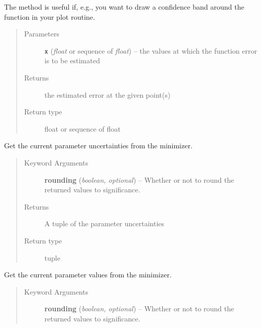 \documentclass[a4paper,10pt,english]{sphinxmanual}
\begin{document}
\begin{fulllineitems}
\begin{fulllineitems}
The method is useful if, e.g., you want to draw a confidence band
around the function in your plot routine.
\begin{quote}\begin{description}
\item[{Parameters}] \leavevmode
\textbf{\texttt{x}} (\emph{float} or sequence of \emph{float}) -- the values at which the function error is to be estimated

\item[{Returns}] \leavevmode
the estimated error at the given point(s)

\item[{Return type}] \leavevmode
float or sequence of float

\end{description}\end{quote}

\end{fulllineitems}


\begin{fulllineitems}
\label{index:kafe.fit.Fit.get_parameter_errors}
Get the current parameter uncertainties from the minimizer.
\begin{quote}\begin{description}
\item[{Keyword Arguments}] \leavevmode
\textbf{rounding} (\emph{boolean, optional}) --
Whether or not to round the returned values to significance.

\item[{Returns}] \leavevmode
A tuple of the parameter uncertainties

\item[{Return type}] \leavevmode
tuple

\end{description}\end{quote}

\end{fulllineitems}


\begin{fulllineitems}
\label{index:kafe.fit.Fit.get_parameter_values}
Get the current parameter values from the minimizer.
\begin{quote}\begin{description}
\item[{Keyword Arguments}] \leavevmode
\textbf{rounding} (\emph{boolean, optional}) --
Whether or not to round the returned values to significance.


\end{description}
\end{quote}
\end{fulllineitems}
\end{fulllineitems}
\end{document}

